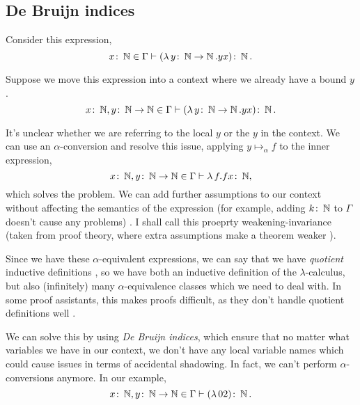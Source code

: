 
\subsection{De Bruijn indices}
\label{section:background_debruijn}
Consider this expression,
\begin{equation*}
  x \colon \operatorname{\mathbb{N}} \in \Gamma \vdash (\lambda \, y \colon \operatorname{\mathbb{N}} \to \operatorname{\mathbb{N}}. y x) \colon \operatorname{\mathbb{N}}.
\end{equation*}

Suppose we move this expression into a context where we already have a bound
$y$.
\begin{equation*}
  x \colon \operatorname{\mathbb{N}}, y \colon \operatorname{\mathbb{N}} \to \operatorname{\mathbb{N}} \in \Gamma \vdash (\lambda \, y \colon \operatorname{\mathbb{N}} \to \operatorname{\mathbb{N}}. y x) \colon \operatorname{\mathbb{N}}.
\end{equation*}

It's unclear whether we are referring to the local $y$ or the $y$ in the context. We can use an
$\alpha$-conversion and resolve this issue, applying $y \mapsto_{\alpha} f$ to the inner expression,
\begin{equation*}
  x \colon \operatorname{\mathbb{N}}, y \colon \operatorname{\mathbb{N}} \to \operatorname{\mathbb{N}} \in \Gamma \vdash \lambda \, f. f x \colon \operatorname{\mathbb{N}},
\end{equation*}
which solves the problem. We can add further assumptions to our context without affecting the
semantics of the expression (for example, adding $k \colon \operatorname{\mathbb{N}}$ to $\Gamma$ doesn't cause any
problems) \cite{pitts_locally_2023}. I shall call this proeprty weakening-invariance (taken from
proof theory, where extra assumptions make a theorem weaker \citep{buss_handbook_1998}).

Since we have these $\alpha$-equivalent expressions, we can say that we have \textit{quotient}
inductive definitions \citep{aydemir_engineering_2008}, so we have both an inductive definition of
the $\lambda$-calculus, but also (infinitely) many $\alpha$-equivalence classes which we need to
deal with. In some proof assistants, this makes proofs difficult, as they don't handle quotient
definitions well \citep{pitts_locally_2023}.

We can solve this by using \textit{De Bruijn indices}, which ensure that no matter what variables we
have in our context, we don't have any local variable names which could cause issues in terms of
accidental shadowing. In fact, we can't perform $\alpha$-conversions anymore. In our example,
\begin{equation*}
  x \colon \operatorname{\mathbb{N}}, y \colon \operatorname{\mathbb{N}} \to \operatorname{\mathbb{N}} \in \Gamma \vdash (\lambda \, 0 2) \colon \operatorname{\mathbb{N}}.
\end{equation*}

